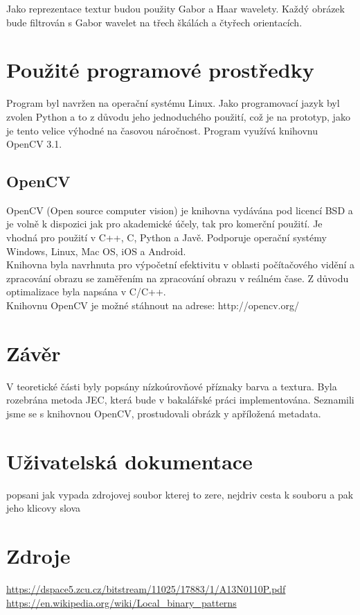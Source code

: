 \documentclass{report}
\begin{document}
Jako reprezentace textur budou použity Gabor a Haar wavelety. Každý obrázek bude filtrován s Gabor wavelet na třech škálách a čtyřech orientacích. 


\chapter{Použité programové prostředky}
Program byl navržen na operační systému Linux. Jako programovací jazyk byl zvolen Python a to z důvodu jeho jednoduchého použití, což je na prototyp, jako je tento velice výhodné na časovou náročnost. Program využívá knihovnu OpenCV 3.1. 
  
\section{OpenCV}
OpenCV (Open source computer vision) je knihovna vydávána pod licencí BSD a je volně k dispozici jak pro akademické účely, tak pro komerční použití. Je vhodná pro použití v C++, C, Python a Javě. Podporuje operační systémy Windows, Linux, Mac OS, iOS a Android.
\\
Knihovna byla navrhnuta pro výpočetní efektivitu v oblasti počítačového vidění a zpracování obrazu se zaměřením na zpracování obrazu v reálném čase. Z důvodu optimalizace byla napsána v C/C++. 
\\
Knihovnu OpenCV je možné stáhnout na adrese: http://opencv.org/

\chapter{Závěr}
V teoretické části byly popsány nízkoúrovňové příznaky barva a textura. Byla rozebrána metoda JEC, která bude v bakalářské práci implementována. Seznamili jsme se s knihovnou OpenCV, prostudovali obrázk y apříložená metadata.

\chapter{Uživatelská dokumentace}
popsani jak vypada zdrojovej soubor kterej to zere, nejdriv cesta k souboru a pak jeho klicovy slova

\chapter{Zdroje}
\url{https://dspace5.zcu.cz/bitstream/11025/17883/1/A13N0110P.pdf} \\
\url{https://en.wikipedia.org/wiki/Local_binary_patterns} \\
\end{document}
